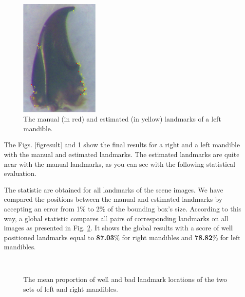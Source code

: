 \documentclass[twoside,twocolumn,10pt]{article}
\begin{document}
\begin{figure}[h]
\centering
\includegraphics[width=0.35\textwidth]{./images/mg_rs}
\caption{The manual (in red) and estimated (in yellow) landmarks of a left mandible.}
\label{figresult2}
\end{figure}

The Figs. \ref{figresult} and \ref{figresult2} show the final results for a right and a left mandible with the manual and estimated landmarks.
The estimated landmarks are quite near with the manual landmarks, as you can see with the following statistical evaluation.

The statistic are obtained for all landmarks of the scene images.
We have compared the positions between the manual and estimated landmarks by accepting an error from 1\% to 2\% of the bounding box's size.
According to this way, a global statistic compares all pairs of corresponding landmarks on all images as presented in Fig. \ref{figctresult}.
It shows the global results with a score of well positioned landmarks equal to \textbf{87.03}\% for right mandibles and \textbf{78.82}\% for left mandibles.
\begin{figure}[h]
\centering
{}~~
\caption{The mean proportion of well and bad landmark locations of the two sets of left and right mandibles.}
\label{figctresult}
\end{figure}
\end{document}
